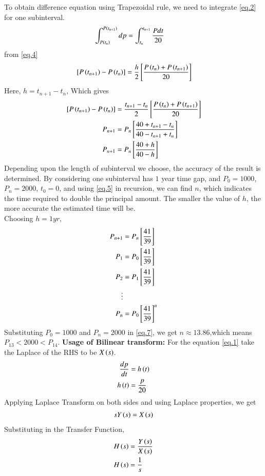 \documentclass[journal,12pt,onecolumn]{IEEEtran}
\theoremstyle{remark}
\begin{document}
To obtain difference equation using Trapezoidal rule, we need to integrate \ref{eq.2} for one subinterval.
\begin{align}
    \int_{P\left(t_n\right)}^{P\left(t_{n+1}\right)} dp &= \int_{t_n}^{t_{n+1}} \frac{Pdt}{20}
\end{align}
from \ref{eq.4}
\begin{align}
     {}\left[ P\left(t_{n+1}\right) -P\left(t_n\right)\right]=\frac{h}{2}{}\left[\frac{P\left(t_n\right)+P\left(t_{n+1}\right)}{20}\right]\label{t.r}
\end{align}
Here, $h=t_{n+1}-t_n$, Which gives
\begin{align}
   {}\left[ P\left(t_{n+1}\right) -P\left(t_n\right)\right]&=\frac{t_{n+1}-t_n}{2}{}\left[\frac{P\left(t_n\right)+P\left(t_{n+1}\right)}{20}\right] \\ 
   P_{n+1}&=P_n{}\left[\frac{40+t_{n+1}-t_n}{40-t_{n+1}+t_n}\right] \label{eq.5} \\
   P_{n+1}&=P_n{}\left[\frac{40+h}{40-h} \right]\label{eq.6}
\end{align}
Depending upon the length of subinterval we choose, the accuracy of the result is determined.
By considering one subinterval has $1$ year time gap, and $P_0=1000$, $P_n=2000$, $t_0=0$, and using \ref{eq.5} in recursion, we can find $n$, which indicates the time required to double the principal amount. The smaller the value of $h$, the more accurate the estimated time will be.\\
Choosing $h=1yr$,
\begin{align}
    P_{n+1}&=P_n{}\left[\frac{41}{39} \right]\\
    P_{1}&=P_0{}\left[\frac{41}{39} \right]\\
    P_{2}&=P_1{}\left[\frac{41}{39} \right]\\
    \vdots \\
    P_{n}&=P_0{}\left[\frac{41}{39} \right]^{n} \label{eq.7}
\end{align}
Substituting $P_0=1000$ and $P_n=2000$ in \ref{eq.7}, we get $n\approx 13.86$,which means $P_{13}<2000<P_{14}.$
\textbf{Usage of Bilinear transform:}
For the equation \ref{eq.1} take the Laplace of the RHS to be  $X\left(s\right)$.
\begin{align}
    \frac{dp}{dt}&=h\left(t\right)\\
    h\left(t\right)&= \frac{p}{20}
\end{align}
Applying Laplace Transform on both sides and using Laplace properties, we get
\begin{align}
    sY\left(s\right)=X\left(s\right)
\end{align}
Substituting in the Transfer Function,
\begin{align}
    H\left(s\right)&=\frac{Y\left(s\right)}{X\left(s\right)}\\
    H\left(s\right)&=\frac{1}{s}\label{eq.8}
\end{align}
\end{document}
